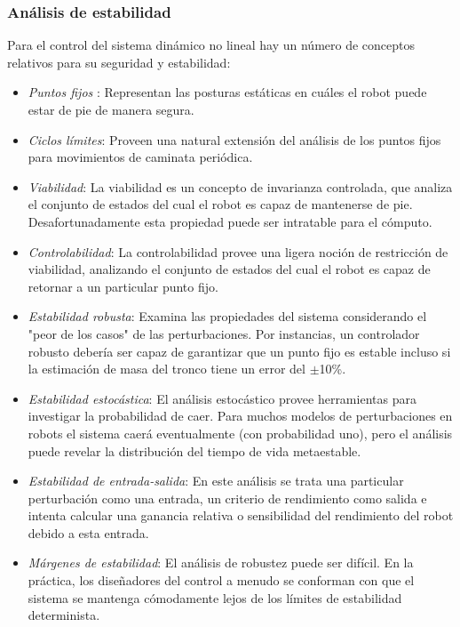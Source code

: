 			\subsubsection*{Análisis de estabilidad}

Para el control del sistema dinámico no lineal hay  un número de conceptos relativos para su seguridad y estabilidad:

\begin{itemize}
\item \textit{Puntos fijos} : Representan las posturas estáticas en cuáles el robot puede estar de pie de manera segura.

\item \textit{Ciclos límites}: Proveen una natural extensión del análisis de los puntos fijos para movimientos de caminata periódica.

\item \textit{Viabilidad}: La viabilidad es un concepto de invarianza controlada, que analiza el conjunto de estados del cual el robot es capaz de mantenerse de pie. Desafortunadamente esta propiedad puede ser intratable para el cómputo.

\item \textit{Controlabilidad}: La controlabilidad provee una ligera noción de restricción de viabilidad, analizando el conjunto de estados del cual el robot es capaz de retornar a un particular punto fijo.

\item \textit{Estabilidad robusta}: Examina las propiedades del sistema considerando el "peor de los casos" de las perturbaciones. Por instancias, un controlador robusto debería ser capaz de garantizar que un punto fijo es estable incluso si la estimación de masa del tronco tiene un error del $\pm$10\%.

\item \textit{Estabilidad estocástica}: El análisis estocástico provee herramientas para investigar la probabilidad de caer. Para muchos modelos de perturbaciones en robots el sistema caerá eventualmente (con probabilidad uno), pero el análisis puede revelar la distribución del tiempo de vida metaestable.

\item \textit{Estabilidad de entrada-salida}: En este análisis se trata una particular perturbación como una entrada, un criterio de rendimiento como salida e intenta calcular una ganancia relativa o sensibilidad del rendimiento del robot debido a esta entrada.

\item \textit{Márgenes de estabilidad}: El análisis de robustez puede ser difícil. En la práctica, los diseñadores del control a menudo se conforman con que el sistema se mantenga cómodamente lejos de los límites de estabilidad determinista.		

\end{itemize}


